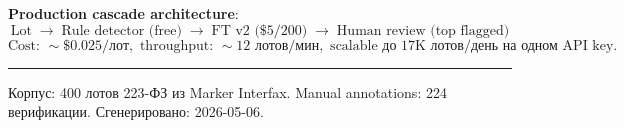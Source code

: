 \documentclass[a4paper,10pt]{article}
\begin{document}
\vspace{4pt}
\noindent\textbf{Production cascade architecture}:
$$\text{Lot} \;\rightarrow\; \text{Rule detector (free)} \;\rightarrow\; \text{FT v2 (\$5/200)} \;\rightarrow\; \text{Human review (top flagged)}$$
$$\text{Cost: }\sim\$0.025\text{/лот}, \text{ throughput: }\sim 12\text{ лотов/мин}, \text{ scalable до 17K лотов/день на одном API key}.$$

\vspace{2pt}
\hrule
\vspace{2pt}
{\footnotesize Корпус: 400 лотов 223-ФЗ из Marker Interfax. Manual annotations: 224 верификации.
Сгенерировано: 2026-05-06.}
\end{document}
